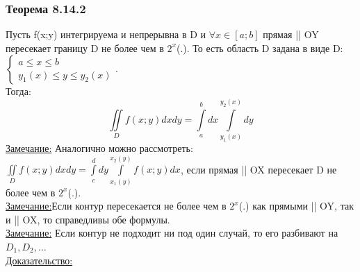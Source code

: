 \documentclass[12pt]{article}
\let\oldint\int
\let\oldiint\iint
\renewcommand{\int}{\oldint\limits}
\renewcommand{\iint}{\oldiint\limits}
\begin{document}
  \subsubsection*{Теорема 8.14.2}\label{th:8.14.2}
  \par\noindent
  Пусть f(x;y) интегрируема и непрерывна в D и $\forall x \in [a;b]$ прямая || OY пересекает границу
  D не более чем в $2^x$(.). То есть область D задана в виде D:
  $\begin{cases}
    a\leq x\leq b\\
    y_1(x)\leq y\leq y_2(x)
  \end{cases}$.\\
  Тогда:
  \[\iint_D f(x;y)dxdy = \int_{a}^{b}dx \int_{y_1(x)}^{y_2(x)}dy\]
  \underline{Замечание:} Аналогично можно рассмотреть: $\iint_D f(x;y)dxdy = \int_{c}^{d}dy
  \int_{x_1(y)}^{x_2(y)}f(x;y)dx$, если прямая || OX пересекает D не более чем в $2^x$(.).\\
  \underline{Замечание:}Если контур пересекается не более чем в $2^x$(.) как прямыми || OY,
  так и || OX, то справедливы обе формулы.\\
  \underline{Замечание:} Если контур не подходит ни под один случай, то его разбивают на $D_1,D_2,\dots$\\
  \underline{Доказательство:}
\end{document}

